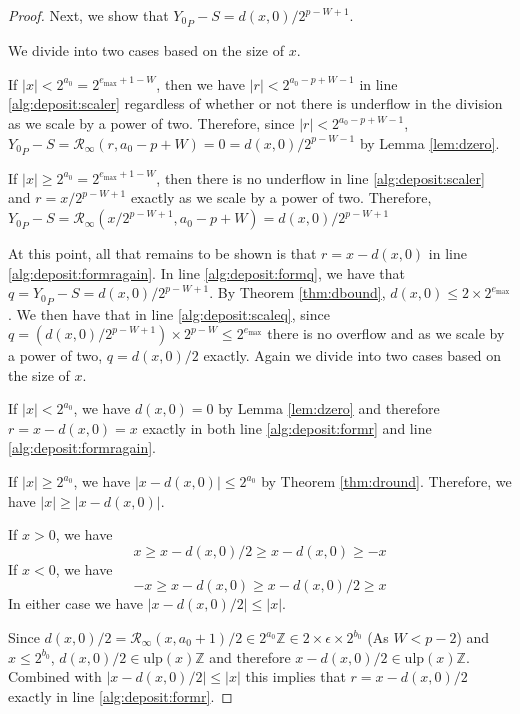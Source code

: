 \documentclass[12pt]{article}
\providecommand{\Z}{\ensuremath{\mathbb{Z}}}
\providecommand{\max}{\ensuremath{\text{max}}}
\providecommand{\ulp}{\ensuremath{\text{ulp}}}
\providecommand{\roundtonearestinfty}{\ensuremath{\mathcal{R}_\text{$\infty$}}}
\theoremstyle{definition}
\numberwithin{equation}{section}
\numberwithin{figure}{section}
\begin{document}
\begin{proof}
        Next, we show that ${Y_0}_P - S = d(x, 0)/2^{p - W + 1}$.

        We divide into two cases based on the size of $x$.

        If $|x| < 2^{a_0} = 2^{e_{\max} + 1 - W}$, then we have $|r| < 2^{a_0 - p + W - 1}$ in line \ref{alg:deposit:scaler} regardless of whether or not there is underflow in the division as we scale by a power of two.
         Therefore, since $|r| < 2^{a_0 - p + W - 1}$, ${Y_0}_P - S = \roundtonearestinfty(r, a_0 - p + W) = 0 = d(x, 0)/2^{p - W - 1}$ by Lemma \ref{lem:dzero}.

        If $|x| \geq 2^{a_0}= 2^{e_{\max} + 1 - W}$, then there is no underflow in line \ref{alg:deposit:scaler} and $r = x / 2^{p - W + 1}$ exactly as we scale by a power of two. Therefore, ${Y_0}_P - S = \roundtonearestinfty(x/2^{p - W + 1}, a_0 - p + W) = d(x, 0)/2^{p - W + 1}$

        At this point, all that remains to be shown is that $r = x - d(x, 0)$ in line \ref{alg:deposit:formragain}. In line \ref{alg:deposit:formq}, we have that $q = {Y_0}_P - S = d(x, 0)/2^{p - W + 1}$. By Theorem \ref{thm:dbound}, $d(x, 0) \leq 2 \times 2^{e_{\max}}$. We then have that in line \ref{alg:deposit:scaleq}, since $q = (d(x, 0)/2^{p - W + 1})\times2^{p - W} \leq 2^{e_{\max}}$ there is no overflow and as we scale by a power of two, $q = d(x, 0)/2$ exactly. Again we divide into two cases based on the size of $x$.

        If $|x| < 2^{a_0}$, we have $d(x, 0) = 0$ by Lemma \ref{lem:dzero} and therefore $r = x - d(x, 0) = x$ exactly in both line \ref{alg:deposit:formr} and line \ref{alg:deposit:formragain}.

        If $|x| \geq 2^{a_0}$, we have $|x - d(x, 0)| \leq 2^{a_0}$ by Theorem \ref{thm:dround}. Therefore, we have $|x| \geq |x - d(x, 0)|$. 

        If $x > 0$, we have
        \begin{equation*}
          x \geq x - d(x, 0)/2 \geq x - d(x, 0) \geq -x
        \end{equation*}
         If $x < 0$, we have
        \begin{equation*}
          -x \geq x - d(x, 0) \geq x - d(x, 0)/2 \geq x
        \end{equation*}
        In either case we have $|x - d(x, 0)/2| \leq |x|$.

        Since $d(x, 0)/2 = \roundtonearestinfty(x, a_0 + 1)/2 \in 2^{a_0}\Z \in 2 \times \epsilon \times 2^{b_0}$ (As $W < p - 2$) and $x \leq 2^{b_0}$, $d(x, 0)/2 \in \ulp(x)\Z$ and therefore $x - d(x, 0)/2 \in \ulp(x)\Z$. Combined with $|x - d(x, 0)/2| \leq |x|$ this implies that $r = x - d(x, 0)/2$ exactly in line \ref{alg:deposit:formr}.


\end{proof}
\end{document}
